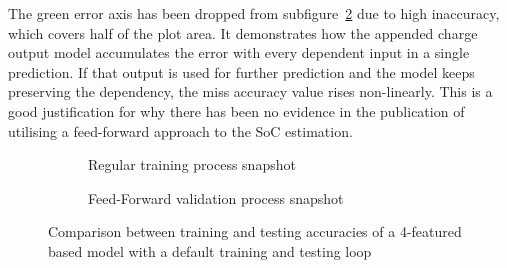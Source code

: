 %
%
%
The green error axis has been dropped from \mbox{subfigure~\ref{subfig:regular_ts}} due to high inaccuracy, which covers half of the plot area.
It demonstrates how the appended charge output model accumulates the error with every dependent input in a single prediction.
If that output is used for further prediction and the model keeps preserving the dependency, the miss accuracy value rises non-linearly.
This is a good justification for why there has been no evidence in the publication of utilising a feed-forward approach to the SoC estimation.
 {
    \begin{figure}[htbp]
        \centering
        \begin{subfigure}[b]{\columnwidth}
            \centering
            
            \caption{Regular training process snapshot}
            \label{subfig:regular_tr}
        \end{subfigure}
        \hfill
        \begin{subfigure}[b]{\columnwidth}
            \centering
            
            \caption{Feed-Forward validation process snapshot}
            \label{subfig:regular_ts}
        \end{subfigure}
        \caption{Comparison between training and testing accuracies of a 4-featured based model with a default training and testing loop}
        \label{fig:regular_tr}
    \end{figure}
}


